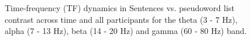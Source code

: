 \begin{figure}[!ht]
	\centering
	\caption{Time-frequency (TF) dynamics in Sentences vs. pseudoword list contrast across time and all participants for the theta (3 - 7 Hz), alpha (7 - 13 Hz), beta (14 - 20 Hz) and gamma (60 - 80 Hz) band.}
    \vspace*{-10pt}
	\label{fig:tf-dynamics-topo}
\end{figure}


